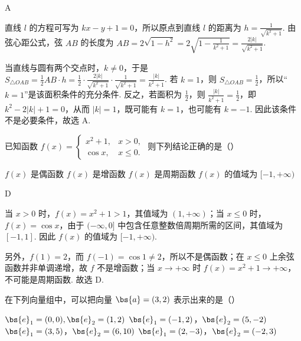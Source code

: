\begin{answer}
A
\end{answer}

\begin{solution}
直线 \(l\) 的方程可写为 \(kx-y+1=0\)，所以原点到直线 \(l\) 的距离为 \(h=\frac{1}{\sqrt{k^2+1}}\). 由弦心距公式，弦 \(AB\) 的长度为
\(AB=2\sqrt{1-h^2}=2\sqrt{1-\frac{1}{k^2+1}}=\frac{2|k|}{\sqrt{k^2+1}}\).

当直线与圆有两个交点时，\(k\neq0\)，于是
\(S_{\triangle OAB}=\frac{1}{2}AB\cdot h=\frac{1}{2}\cdot\frac{2|k|}{\sqrt{k^2+1}}\cdot\frac{1}{\sqrt{k^2+1}}=\frac{|k|}{k^2+1}\).
若 \(k=1\)，则 \(S_{\triangle OAB}=\frac{1}{2}\)，所以“\(k=1\)”是该面积条件的充分条件. 反之，若面积为 \(\frac{1}{2}\)，则 \(\frac{|k|}{k^2+1}=\frac{1}{2}\)，即 \(k^2-2|k|+1=0\)，从而 \(|k|=1\)，既可能有 \(k=1\)，也可能有 \(k=-1\). 因此该条件不是必要条件，故选 A.
\end{solution}

\begin{problem}
已知函数 \( f(x) = \begin{cases}
x^2 + 1, & x > 0,\\
\cos x, & x \leqslant 0.
\end{cases} \) 则下列结论正确的是（\quad）

\choices
    {\(f(x)\) 是偶函数}
    {\(f(x)\) 是增函数}
    {\(f(x)\) 是周期函数}
    {\(f(x)\) 的值域为 \([-1, +\infty)\)}
\end{problem}

\begin{answer}
D
\end{answer}

\begin{solution}
当 \(x>0\) 时，\(f(x)=x^2+1>1\)，其值域为 \((1,+\infty)\)；当 \(x\leqslant0\) 时，\(f(x)=\cos x\)，由于 \((-\infty,0]\) 中包含任意整数倍周期所需的区间，其值域为 \([-1,1]\). 因此 \(f(x)\) 的值域为 \([-1,+\infty)\).

另外，\(f(1)=2\)，而 \(f(-1)=\cos1\neq2\)，所以不是偶函数；在 \(x\leqslant0\) 上余弦函数并非单调递增，故 \(f\) 不是增函数；当 \(x\to+\infty\) 时 \(f(x)=x^2+1\to+\infty\)，不可能是周期函数. 故选 D.
\end{solution}

\begin{problem}
在下列向量组中，可以把向量 \(\bs{a} = (3, 2)\) 表示出来的是（\quad）

\choices
    {\(\bs{e}_1 = (0,0), \bs{e}_2 = (1,2)\)}
    {\(\bs{e}_1 = (-1,2)\)，\(\bs{e}_2 = (5, -2)\)}
    {\(\bs{e}_1 = (3,5)\)，\(\bs{e}_2 = (6,10)\)}
    {\(\bs{e}_1 = (2, -3)\)，\(\bs{e}_2 = (-2, 3)\)}
\end{problem}

